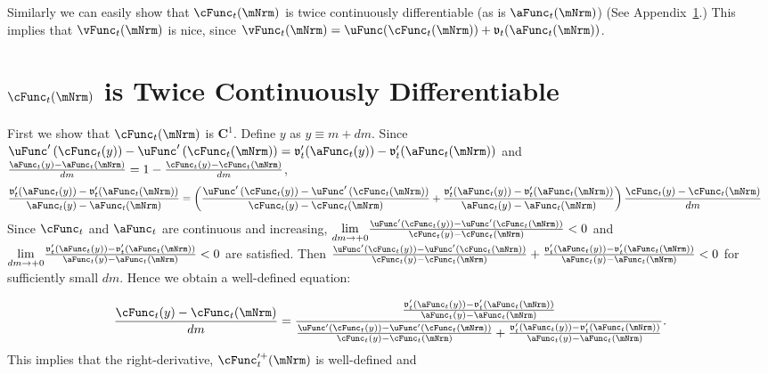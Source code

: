 \documentclass[\econtexRoot/BufferStockTheory]{subfiles}
\begin{document}
Similarly we can easily show that $\cFunc_{t}(\mNrm)$ is twice
continuously differentiable (as is $\aFunc_{t}(\mNrm)$) (See
Appendix~\ref{sec:CIsTwiceDifferentiable}.)  This implies that
$\vFunc_{t}(\mNrm)$ is nice, since
$\vFunc_{t}(\mNrm)=\uFunc(\cFunc_{t}(\mNrm))+\mathfrak{v}_{t}({\aFunc}_{t}(\mNrm))$.

\hypertarget{cFunc-is-Twice-Continuously-Differentiable}{}
\section{
  \texorpdfstring{$\cFunc_{t}(\mNrm)$}{c} is Twice Continuously Differentiable}\label{sec:CIsTwiceDifferentiable}

First we show that $\cFunc_{t}(\mNrm)$ is $\mathbf{C}^{1}$.  Define $y$ as $y\equiv m+dm$.  Since $\uFunc^{\prime }\left( \cFunc_{t}(y)\right) -\uFunc^{\prime }\left(
    \cFunc_{t}(\mNrm)\right) =\mathfrak{v}_{t}^{\prime
  }({\aFunc}_{t}(y))-\mathfrak{v}_{t}^{\prime }({\aFunc}_{t}(\mNrm))$ and $
  \frac{{\aFunc}_{t}(y)-{\aFunc}_{t}(\mNrm)}{dm}=1-\frac{\cFunc_{t}(y)-\cFunc_{t}(\mNrm)}{dm}$,
\begin{align*}
  \frac{\mathfrak{v}_{t}^{\prime }({\aFunc}_{t}(y))-\mathfrak{v}_{t}^{\prime }({\aFunc}_{t}(\mNrm))}{{\aFunc}_{t}(y)-{\aFunc}_{t}(\mNrm)} %
  & =   
       \left( \frac{\uFunc^{\prime }\left( \cFunc_{t}(y)\right) -\uFunc^{\prime }\left( \cFunc_{t}(\mNrm)\right) }{\cFunc_{t}(y)-\cFunc_{t}(\mNrm)}+\frac{\mathfrak{v}_{t}^{\prime }({\aFunc}_{t}(y))-\mathfrak{v}_{t}^{\prime }({\aFunc}_{t}(\mNrm))}{{\aFunc}_{t}(y)-{\aFunc}_{t}(\mNrm)}\right) \frac{\cFunc_{t}(y)-\cFunc_{t}(\mNrm)}{dm}
\end{align*}
Since $\cFunc_{t}$ and $\aFunc_{t}$ are continuous and increasing, $\underset{
dm\rightarrow +0}{\lim }\frac{\uFunc^{\prime }\left( \cFunc_{t}(y)\right) -\uFunc^{\prime
}\left( \cFunc_{t}(\mNrm)\right) }{\cFunc_{t}(y)-\cFunc_{t}(\mNrm)}<0$ and
$\underset{dm\rightarrow+0}{\lim }\frac{\mathfrak{v}_{t}^{\prime }({\aFunc}_{t}(y))-\mathfrak{v}_{t}^{\prime }({\aFunc}_{t}(\mNrm))}{
{\aFunc}_{t}(y)-{\aFunc}_{t}(\mNrm)}< 0$
are satisfied. Then $\frac{\uFunc^{\prime }\left(
\cFunc_{t}(y)\right) -\uFunc^{\prime }\left( \cFunc_{t}(\mNrm)\right) }{\cFunc_{t}(y)-\cFunc_{t}(\mNrm)}+
\frac{\mathfrak{v}_{t}^{\prime }({\aFunc}_{t}(y))-\mathfrak{v}_{t}^{\prime }({\aFunc}_{t}(\mNrm))}{{\aFunc}_{t}(y)-{\aFunc}_{t}(\mNrm)}
<0$ for sufficiently small $dm$.
 Hence we obtain a well-defined equation:

\begin{equation*}
\frac{\cFunc_{t}(y)-\cFunc_{t}(\mNrm)}{dm}=\frac{\frac{\mathfrak{v}_{t}^{\prime
}({\aFunc}_{t}(y))-\mathfrak{v}_{t}^{\prime }({\aFunc}_{t}(\mNrm))}{{\aFunc}_{t}(y)-{\aFunc}_{t}(\mNrm)}}{\frac{\uFunc^{\prime
}\left( \cFunc_{t}(y)\right) -\uFunc^{\prime }\left( \cFunc_{t}(\mNrm)\right) }{
\cFunc_{t}(y)-\cFunc_{t}(\mNrm)}+\frac{\mathfrak{v}_{t}^{\prime }({\aFunc}_{t}(y))-\mathfrak{v}_{t}^{\prime }({\aFunc}_{t}(\mNrm))
}{{\aFunc}_{t}(y)-{\aFunc}_{t}(\mNrm)}}.
\end{equation*}
This implies that the right-derivative, $\cFunc_{t}^{\prime +}(\mNrm)$ is
well-defined and
\end{document}
